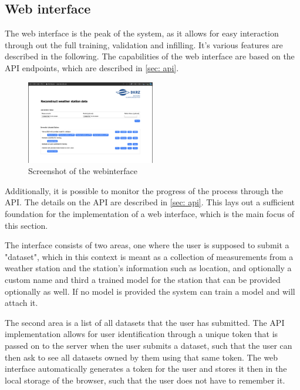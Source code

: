 \subsection{Web interface}

The web interface is the peak of the system, as it allows for easy interaction through out the full training, validation and infilling.
It's various features are described in the following. The capabilities of the web interface are based on the API endpoints, which are described in \autoref{sec: api}.

\begin{figure}
    \centering
    \includegraphics[width=0.5\textwidth]{resources/images/webinterface_screenshot.png}
    \caption{Screenshot of the webinterface}
    \label{fig: webinterface_screenshot}
    \end{figure}
Additionally, it is possible to monitor the progress of the process through the API.
The details on the API are described in \autoref{sec: api}.
This lays out a sufficient foundation for the implementation of a web interface, which is the main focus of this section.

The interface consists of two areas, one where the user is supposed to submit a "dataset", which in this context is meant as a collection of measurements from a weather station and the station's information such as location, and optionally a custom name and third a trained model for the station that can be provided optionally as well.
If no model is provided the system can train a model and will attach it.

The second area is a list of all datasets that the user has submitted.
The API implementation allows for user identification through a unique token that is passed on to the server when the user submits a dataset, such that the user can then ask to see all datasets owned by them using that same token.
The web interface automatically generates a token for the user and stores it then in the local storage of the browser, such that the user does not have to remember it.

